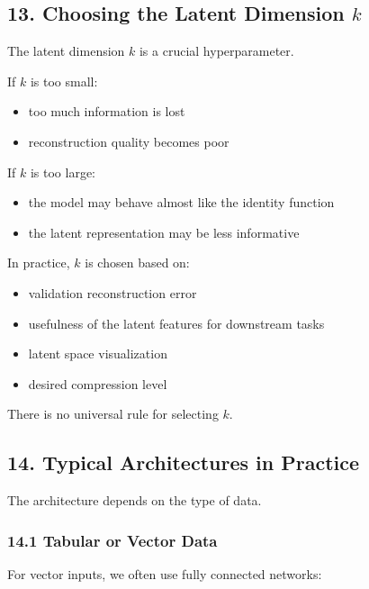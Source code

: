 \documentclass[
  italian,
  11pt,
]{article}
\begin{document}
\subsection{\texorpdfstring{13. Choosing the Latent Dimension
\(k\)}{13. Choosing the Latent Dimension k}}\label{choosing-the-latent-dimension-k}

The latent dimension \(k\) is a crucial hyperparameter.

If \(k\) is too small:

\begin{itemize}
\item
  too much information is lost
\item
  reconstruction quality becomes poor
\end{itemize}

If \(k\) is too large:

\begin{itemize}
\item
  the model may behave almost like the identity function
\item
  the latent representation may be less informative
\end{itemize}

In practice, \(k\) is chosen based on:

\begin{itemize}
\item
  validation reconstruction error
\item
  usefulness of the latent features for downstream tasks
\item
  latent space visualization
\item
  desired compression level
\end{itemize}

There is no universal rule for selecting \(k\).

\subsection{14. Typical Architectures in
Practice}\label{typical-architectures-in-practice}

The architecture depends on the type of data.

\subsubsection{14.1 Tabular or Vector
Data}\label{tabular-or-vector-data}

For vector inputs, we often use fully connected networks:
\end{document}
